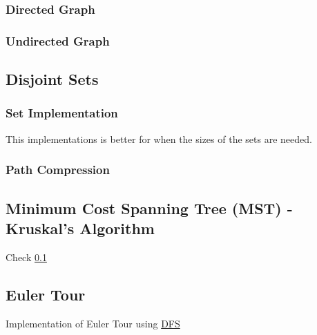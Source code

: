 \subsubsection{Directed Graph}


\subsubsection{Undirected Graph}



\clearpage


\subsection{Disjoint Sets} \label{disjoint_sets}

\subsubsection{Set Implementation}
This implementations is better for when the sizes of the sets are needed.


\clearpage

\subsubsection{Path Compression}


%


\subsection{Minimum Cost Spanning Tree (MST) - Kruskal's Algorithm}
Check \ref{disjoint_sets} 



\clearpage


\subsection{Euler Tour} \label{euler_tour}
Implementation of Euler Tour using \hyperref[graph_traversals]{DFS}



